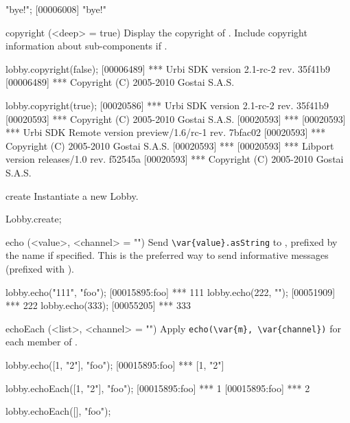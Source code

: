 \begin{urbiscriptapi}
\begin{urbiscript}
"bye!";
[00006008] "bye!"
\end{urbiscript}

\item[copyright](<deep> = true)%
  Display the copyright of \usdk.  Include copyright information
  about sub-components if .
\begin{urbiscript}
lobby.copyright(false);
[00006489] *** Urbi SDK version 2.1-rc-2 rev. 35f41b9
[00006489] *** Copyright (C) 2005-2010 Gostai S.A.S.

lobby.copyright(true);
[00020586] *** Urbi SDK version 2.1-rc-2 rev. 35f41b9
[00020593] *** Copyright (C) 2005-2010 Gostai S.A.S.
[00020593] ***
[00020593] *** Urbi SDK Remote version preview/1.6/rc-1 rev. 7bfac02
[00020593] *** Copyright (C) 2005-2010 Gostai S.A.S.
[00020593] ***
[00020593] *** Libport version releases/1.0 rev. f52545a
[00020593] *** Copyright (C) 2005-2010 Gostai S.A.S.
\end{urbiscript}

\item[create]
  Instantiate a new Lobby.
\begin{urbiassert}
Lobby.create;
\end{urbiassert}

\item[echo](<value>, <channel> = "")%
  Send \lstinline|\var{value}.asString| to \this, prefixed
  by the   name if specified.  This is
  the preferred way to send informative messages (prefixed with
  \samp{***}).
\begin{urbiscript}
lobby.echo("111", "foo");
[00015895:foo] *** 111
lobby.echo(222, "");
[00051909] *** 222
lobby.echo(333);
[00055205] *** 333
\end{urbiscript}

\item[echoEach](<list>, <channel> = "")%
  Apply \lstinline|echo(\var{m}, \var{channel})| for each member  of
  .
\begin{urbiscript}
lobby.echo([1, "2"], "foo");
[00015895:foo] *** [1, "2"]

lobby.echoEach([1, "2"], "foo");
[00015895:foo] *** 1
[00015895:foo] *** 2

lobby.echoEach([], "foo");
\end{urbiscript}



\end{urbiscriptapi}
